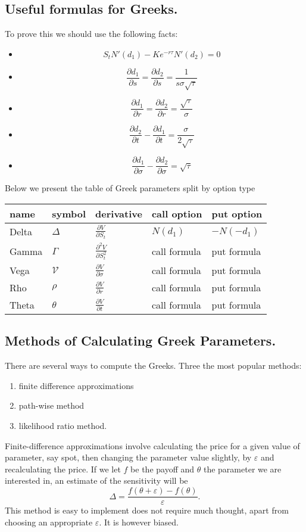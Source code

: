 \documentclass{book}
\begin{document}
\subsection{Useful formulas for Greeks.}
To prove this we should use the following facts:
\begin{itemize}
\item
$$
S_{t}N'(d_{1})-Ke^{-r\tau}N'(d_{2})=0
$$
\item
$$
\frac{\partial d_{1}}{\partial s}=\frac{\partial d_{2}}{\partial s}=\frac{1}{s\sigma\sqrt{\tau}}
$$
\item
$$
\frac{\partial d_{1}}{\partial r}=\frac{\partial d_{2}}{\partial r}=\frac{\sqrt{\tau}}{\sigma}
$$
\item
$$
\frac{\partial d_{2}}{\partial t}-\frac{\partial d_{1}}{\partial t}=\frac{\sigma}{2\sqrt{\tau}}
$$
\item
$$
\frac{\partial d_{1}}{\partial \sigma}-\frac{\partial d_{2}}{\partial \sigma}=\sqrt{\tau}
$$
\end{itemize}

Below we present the table of Greek parameters split by option type

\begin{tabular}{|l|l|l|l|l|}
\hline
name&symbol&derivative&call option & put option\\
\hline
Delta&$\Delta$&$\frac{\partial V}{\partial S_{t}}$&$N(d_{1})$&$-N(-d_{1})$\\
Gamma&$\Gamma$&$\frac{\partial^{2} V}{\partial S_{t}^{2}}$&call formula&put formula\\
Vega&$\mathcal{V}$&$\frac{\partial V}{\partial \sigma}$&call formula&put formula\\
Rho&$\rho$&$\frac{\partial V}{\partial r}$&call formula&put formula\\
Theta&$\theta$&$\frac{\partial V}{\partial t}$&call formula&put formula\\
\hline

\end{tabular}
\subsection{Methods of Calculating Greek Parameters.}
There are several ways to compute the Greeks. Three the most popular methods:
\begin{enumerate}
\item finite difference approximations
\item path-wise method
\item likelihood ratio method.
\end{enumerate}
Finite-difference approximations involve calculating the price for a given value of parameter, say spot, then changing the parameter value slightly, by $\varepsilon$ and recalculating the price. If we let $f$ be the payoff and $\theta$ the parameter we are interested in, an estimate of the sensitivity will be 
$$
\Delta=\frac{f(\theta+\varepsilon)-f(\theta)}{\varepsilon}.
$$
This method is easy to implement does not require much thought, apart from choosing an appropriate $\varepsilon$. It is however biased.
\end{document}
